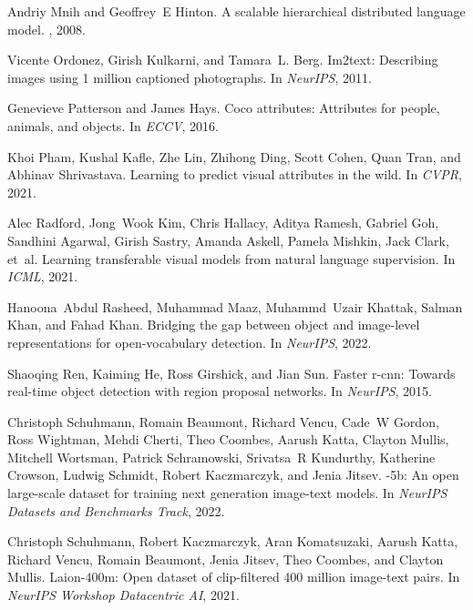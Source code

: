 \documentclass[10pt,twocolumn,letterpaper]{article}
\begin{document}
\begin{thebibliography}{10}
Andriy Mnih and Geoffrey~E Hinton.
\newblock A scalable hierarchical distributed language model.
, 2008.

Vicente Ordonez, Girish Kulkarni, and Tamara~L. Berg.
\newblock Im2text: Describing images using 1 million captioned photographs.
\newblock In {\em NeurIPS}, 2011.

Genevieve Patterson and James Hays.
\newblock Coco attributes: Attributes for people, animals, and objects.
\newblock In {\em ECCV}, 2016.

Khoi Pham, Kushal Kafle, Zhe Lin, Zhihong Ding, Scott Cohen, Quan Tran, and
  Abhinav Shrivastava.
\newblock Learning to predict visual attributes in the wild.
\newblock In {\em CVPR}, 2021.

Alec Radford, Jong~Wook Kim, Chris Hallacy, Aditya Ramesh, Gabriel Goh,
  Sandhini Agarwal, Girish Sastry, Amanda Askell, Pamela Mishkin, Jack Clark,
  et~al.
\newblock Learning transferable visual models from natural language
  supervision.
\newblock In {\em ICML}, 2021.

Hanoona~Abdul Rasheed, Muhammad Maaz, Muhammd~Uzair Khattak, Salman Khan, and
  Fahad Khan.
\newblock Bridging the gap between object and image-level representations for
  open-vocabulary detection.
\newblock In {\em NeurIPS}, 2022.

Shaoqing Ren, Kaiming He, Ross Girshick, and Jian Sun.
\newblock Faster r-cnn: Towards real-time object detection with region proposal
  networks.
\newblock In {\em NeurIPS}, 2015.

Christoph Schuhmann, Romain Beaumont, Richard Vencu, Cade~W Gordon, Ross
  Wightman, Mehdi Cherti, Theo Coombes, Aarush Katta, Clayton Mullis, Mitchell
  Wortsman, Patrick Schramowski, Srivatsa~R Kundurthy, Katherine Crowson,
  Ludwig Schmidt, Robert Kaczmarczyk, and Jenia Jitsev.
-5b: An open large-scale dataset for training next generation
  image-text models.
\newblock In {\em NeurIPS Datasets and Benchmarks Track}, 2022.

Christoph Schuhmann, Robert Kaczmarczyk, Aran Komatsuzaki, Aarush Katta,
  Richard Vencu, Romain Beaumont, Jenia Jitsev, Theo Coombes, and Clayton
  Mullis.
\newblock Laion-400m: Open dataset of clip-filtered 400 million image-text
  pairs.
\newblock In {\em NeurIPS Workshop Datacentric AI}, 2021.


\end{thebibliography}
\end{document}
